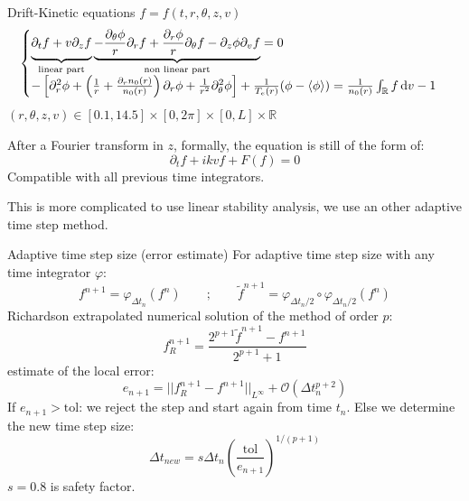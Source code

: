 \documentclass{beamer}
\begin{document}
\begin{frame}{Drift-Kinetic equations}
  $f = f(t,r,\theta,z,v)$
  $$
    \begin{cases}
      \underbrace{\vphantom{\frac{}{}}\partial_tf + v\partial_zf}_{\text{linear part}} \underbrace{- \frac{\partial_\theta\phi}{r}\partial_rf + \frac{\partial_r\phi}{r}\partial_\theta f - \partial_z\phi\partial_vf}_{\text{non linear part}} = 0\\
      -\left[ \partial_r^2\phi + \left(\frac{1}{r}+\frac{\partial_rn_0(r)}{n_0(r)}\right)\partial_r\phi + \frac{1}{r^2}\partial_\theta^2\phi \right]+\frac{1}{T_e(r)}(\phi-\langle\phi\rangle) = \frac{1}{n_0(r)}\int_{\mathbb{R}}f\,\mathrm{d}v-1
    \end{cases}
  $$
  $(r,\theta,z,v)\in[0.1,14.5]\times[0,2\pi]\times[0,L]\times\mathbb{R}$

  After a Fourier transform in $z$, formally, the equation is still of the form of:
  $$
    \partial_t f + ikvf + F(f) = 0
  $$
  Compatible with all previous time integrators.

  This is more complicated to use linear stability analysis, we use an other adaptive time step method.
\end{frame}
\begin{frame}{Adaptive time step size (error estimate)}
  For adaptive time step size with any time integrator $\varphi$:
  $$
    f^{n+1} = \varphi_{\Delta t_n}(f^n)\qquad;\qquad \tilde{f}^{n+1}=\varphi_{\Delta t_n/2}\circ\varphi_{\Delta t_n/2}(f^n)
  $$
  Richardson extrapolated numerical solution of the method of order $p$:
  $$
    f^{n+1}_R = \frac{2^{p+1}\tilde{f}^{n+1}-f^{n+1}}{2^{p+1}+1}
  $$
  estimate of the local error:
  $$
    e_{n+1} = || f^{n+1}_R - f^{n+1} ||_{L^\infty} + \mathcal{O}(\Delta t_n^{p+2})
  $$
  If $e_{n+1}>\text{tol}$: we reject the step and start again from time $t_n$. Else we determine the new time step size:
  $$
    \Delta t_{new} = s\Delta t_n\left(\frac{\text{tol}}{e_{n+1}}\right)^{1/(p+1)}
  $$
  $s=0.8$ is safety factor.
\end{frame}
\begin{frame}{Ion temperature gradient instability: numerical results}
    \begin{figure}\centering
      \texttt{[image: img/\{driftkinetic-tol1.00e-02-64x64x64x128-pert0]}.pdf}
    \end{figure}
\end{frame}
\end{document}
